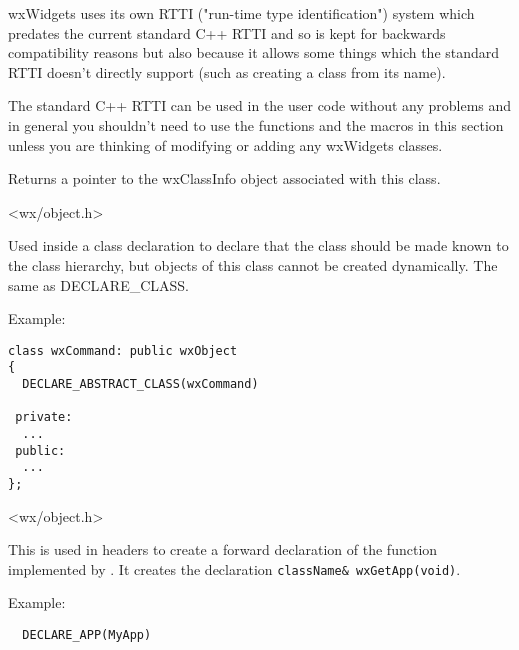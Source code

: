 wxWidgets uses its own RTTI ("run-time type identification") system which
predates the current standard C++ RTTI and so is kept for backwards
compatibility reasons but also because it allows some things which the
standard RTTI doesn't directly support (such as creating a class from its
name).

The standard C++ RTTI can be used in the user code without any problems and in
general you shouldn't need to use the functions and the macros in this section
unless you are thinking of modifying or adding any wxWidgets classes.




\label{classinfo}


Returns a pointer to the wxClassInfo object associated with this class.


<wx/object.h>


\label{declareabstractclass}


Used inside a class declaration to declare that the class should be
made known to the class hierarchy, but objects of this class cannot be created
dynamically. The same as DECLARE\_CLASS.

Example:

\begin{verbatim}
class wxCommand: public wxObject
{
  DECLARE_ABSTRACT_CLASS(wxCommand)

 private:
  ...
 public:
  ...
};
\end{verbatim}


<wx/object.h>


\label{declareapp}


This is used in headers to create a forward declaration of the
 function implemented by
. It creates the declaration
{\tt className\& wxGetApp(void)}.

Example:

\begin{verbatim}
  DECLARE_APP(MyApp)
\end{verbatim}

